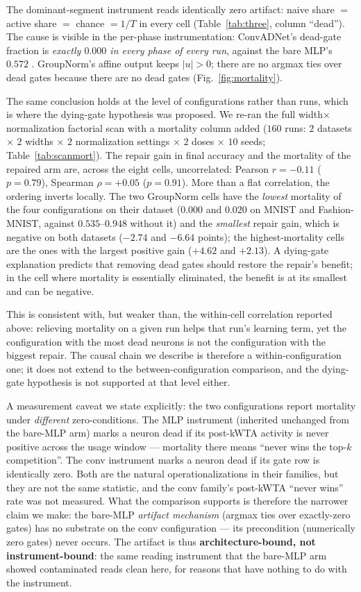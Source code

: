 \documentclass[review,12pt,number]{elsarticle}
\begin{document}
The dominant-segment instrument reads identically zero artifact:
naive share $=$ active share $=$ chance $= 1/T$ in every cell
(Table~\ref{tab:three}, column ``dead''). The cause is visible in the
per-phase instrumentation: ConvADNet's dead-gate fraction is
\emph{exactly $0.000$ in every phase of every run}, against the bare
MLP's $0.572$ . GroupNorm's affine output keeps
$|u| > 0$; there are no argmax ties over dead gates because there are
no dead gates (Fig.~\ref{fig:mortality}).

The same conclusion holds at the level of configurations rather than
runs, which is where the dying-gate hypothesis was proposed. We
re-ran the full width$\times$normalization factorial scan with a
mortality column added ($160$ runs: $2$ datasets $\times$ $2$ widths
$\times$ $2$ normalization settings $\times$ $2$ doses $\times$ $10$
seeds; Table~\ref{tab:scanmort}). The repair gain in final accuracy
and the mortality of the repaired arm are, across the eight cells,
uncorrelated: Pearson $r = -0.11$ ($p = 0.79$), Spearman
$\rho = +0.05$ ($p = 0.91$). More than a flat correlation, the ordering
inverts locally. The two GroupNorm cells have the \emph{lowest}
mortality of the four configurations on their dataset ($0.000$ and
$0.020$ on MNIST and Fashion-MNIST, against $0.535$--$0.948$ without
it) and the \emph{smallest} repair gain, which is negative on both
datasets ($-2.74$ and $-6.64$ points); the highest-mortality cells are
the ones with the largest positive gain ($+4.62$ and $+2.13$). A
dying-gate explanation predicts that removing dead gates should
restore the repair's benefit; in the cell where mortality is
essentially eliminated, the benefit is at its smallest and can be
negative.

This is consistent with, but weaker than, the within-cell correlation
reported above: relieving mortality on a given run helps that run's
learning term, yet the configuration with the most dead neurons is not
the configuration with the biggest repair. The causal chain we
describe is therefore a within-configuration one; it does not extend to
the between-configuration comparison, and the dying-gate hypothesis is
not supported at that level either.

A measurement caveat we state explicitly: the two configurations
report mortality under \emph{different} zero-conditions. The MLP
instrument (inherited unchanged from the bare-MLP arm) marks a neuron dead if its
post-kWTA activity is never positive across the usage window ---
mortality there means ``never wins the top-$k$ competition''. The
conv instrument marks a neuron dead if its gate row is identically
zero. Both are the natural operationalizations in their families,
but they are not the same statistic, and the conv family's
post-kWTA ``never wins'' rate was not measured. What the comparison
supports is therefore the narrower claim we make: the bare-MLP
\emph{artifact mechanism} (argmax ties over exactly-zero gates) has
no substrate on the conv configuration --- its precondition
(numerically zero gates) never occurs. The artifact is thus
\textbf{architecture-bound, not instrument-bound}: the same reading
instrument that the bare-MLP arm showed contaminated reads clean here, for reasons
that have nothing to do with the instrument.
\end{document}
